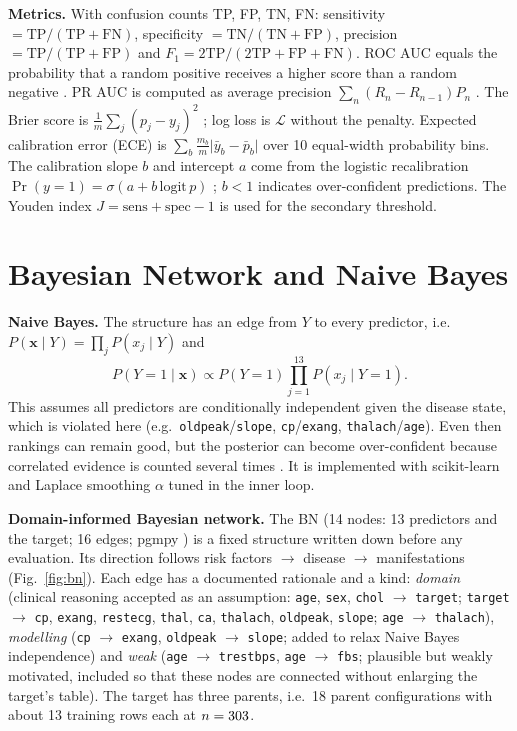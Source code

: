 \documentclass[conference]{IEEEtran}
\begin{document}
\textbf{Metrics.} With confusion counts TP, FP, TN, FN: sensitivity $=\mathrm{TP}/(\mathrm{TP}+\mathrm{FN})$, specificity $=\mathrm{TN}/(\mathrm{TN}+\mathrm{FP})$, precision $=\mathrm{TP}/(\mathrm{TP}+\mathrm{FP})$ and $F_1=2\mathrm{TP}/(2\mathrm{TP}+\mathrm{FP}+\mathrm{FN})$. ROC AUC equals the probability that a random positive receives a higher score than a random negative \cite{hanley1982,fawcett2006}. PR AUC is computed as average precision $\sum_n(R_n-R_{n-1})P_n$ \cite{davis2006}. The Brier score is $\frac1m\sum_j(p_j-y_j)^2$ \cite{brier1950}; log loss is $\mathcal L$ without the penalty. Expected calibration error (ECE) is $\sum_b \frac{m_b}{m}\lvert\bar y_b-\bar p_b\rvert$ over 10 equal-width probability bins. The calibration slope $b$ and intercept $a$ come from the logistic recalibration $\Pr(y=1)=\sigma(a+b\,\mathrm{logit}\,p)$ \cite{steyerberg2010}; $b<1$ indicates over-confident predictions. The Youden index $J=\text{sens}+\text{spec}-1$ \cite{youden1950} is used for the secondary threshold.

\section{Bayesian Network and Naive Bayes}
\textbf{Naive Bayes.} The structure has an edge from $Y$ to every predictor, i.e.\ $P(\mathbf x\mid Y)=\prod_{j}P(x_j\mid Y)$ and
\begin{equation}
P(Y=1\mid\mathbf x)\propto P(Y=1)\prod_{j=1}^{13}P(x_j\mid Y=1).
\end{equation}
This assumes all predictors are conditionally independent given the disease state, which is violated here (e.g.\ \texttt{oldpeak}/\texttt{slope}, \texttt{cp}/\texttt{exang}, \texttt{thalach}/\texttt{age}). Even then rankings can remain good, but the posterior can become over-confident because correlated evidence is counted several times \cite{domingos1997}. It is implemented with scikit-learn \cite{pedregosa2011} and Laplace smoothing $\alpha$ tuned in the inner loop.

\textbf{Domain-informed Bayesian network.} The BN (14 nodes: 13 predictors and the target; 16 edges; pgmpy \cite{ankan2015}) is a fixed structure written down before any evaluation. Its direction follows risk factors $\rightarrow$ disease $\rightarrow$ manifestations (Fig.~\ref{fig:bn}). Each edge has a documented rationale and a kind: \emph{domain} (clinical reasoning accepted as an assumption: \texttt{age}, \texttt{sex}, \texttt{chol} $\rightarrow$ \texttt{target}; \texttt{target} $\rightarrow$ \texttt{cp}, \texttt{exang}, \texttt{restecg}, \texttt{thal}, \texttt{ca}, \texttt{thalach}, \texttt{oldpeak}, \texttt{slope}; \texttt{age} $\rightarrow$ \texttt{thalach}), \emph{modelling} (\texttt{cp} $\rightarrow$ \texttt{exang}, \texttt{oldpeak} $\rightarrow$ \texttt{slope}; added to relax Naive Bayes independence) and \emph{weak} (\texttt{age} $\rightarrow$ \texttt{trestbps}, \texttt{age} $\rightarrow$ \texttt{fbs}; plausible but weakly motivated, included so that these nodes are connected without enlarging the target's table). The target has three parents, i.e.\ 18 parent configurations with about 13 training rows each at $n=303$.
\end{document}
